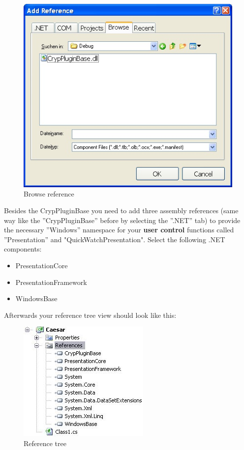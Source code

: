 \clearpage
\begin{figure}[h!]
	\centering
		\includegraphics{figures/browse_reference.jpg}
	\caption{Browse reference}
	\label{fig:browse_reference}
\end{figure}

Besides the CrypPluginBase you need to add three assembly references (same way like the ''CrypPluginBase'' before by selecting the ''.NET'' tab) to provide the necessary ''Windows'' namespace for your \textbf{user control} functions called ''Presentation'' and "QuickWatchPresentation". Select the following .NET components:

\begin{itemize}
    \item PresentationCore
    \item PresentationFramework
    \item WindowsBase
\end{itemize}
\clearpage

Afterwards your reference tree view should look like this:

\begin{figure}[h!]
		\includegraphics{figures/reference_tree.jpg}
	\caption{Reference tree}
	\label{fig:reference_tree}
\end{figure}

